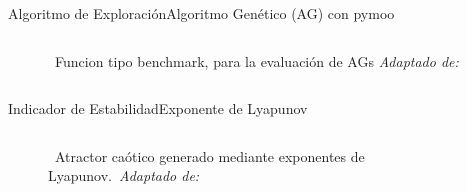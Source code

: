\begin{frame}{Algoritmo de Exploración}{Algoritmo Genético (AG) con pymoo}
\begin{columns}
\begin{column}{0.4\textwidth}
\begin{figure}[H]
{                }
                \vspace{-0.25cm}
                \caption{\tiny~Funcion tipo benchmark, para la evaluación de AGs \textit{Adaptado de:}~\cite{silva2018}}%
                \label{fig:genetic_algorithm}
            \end{figure}
        \end{column}
    \end{columns}
\end{frame}

\begin{frame}{Indicador de Estabilidad}{Exponente de Lyapunov}
    \begin{columns}
        \begin{column}{0.4\textwidth}
            \centering
            \begin{figure}[H]
                \centering
                \vspace{-0.25cm}
                \caption{\tiny~Atractor caótico generado mediante exponentes de Lyapunov.~\textit{Adaptado de:}~\cite{bourke_lyapunov_attractors_2001}}%
                \label{fig:Lyapunov_diagram}

\end{figure}
\end{column}
\end{columns}
\end{frame}
